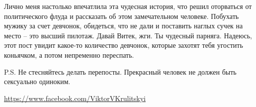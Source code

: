 Лично меня настолько впечатлила эта чудесная история, что решил оторваться от
политического флуда и рассказать об этом замечательном человеке. Побухать
мужику за счет девчонок, обидеться, что не дали и поставить наглых сучек на
место – это высший пилотаж. Давай Витек, жги. Ты чудесный парняга. Надеюсь,
этот пост увидит какое-то количество девчонок, которые захотят тебя угостить
коньячком, а потом непременно переспать.

P.S. Не стесняйтесь делать перепосты. Прекрасный человек не должен быть
сексуально одиноким.

\url{https://www.facebook.com/ViktorVKrulitskyi}

